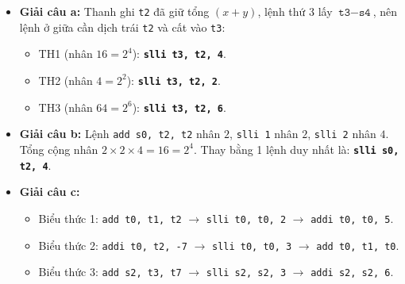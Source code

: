 \begin{itemize}
    \item \textbf{Giải câu a:} Thanh ghi \texttt{t2} đã giữ tổng $(x + y)$, lệnh thứ 3 lấy $\texttt{t3} - \texttt{s4}$, nên lệnh ở giữa cần dịch trái \texttt{t2} và cất vào \texttt{t3}:
    \begin{itemize}
        \item TH1 (nhân $16 = 2^4$): \textbf{\texttt{slli t3, t2, 4}}.
        \item TH2 (nhân $4 = 2^2$): \textbf{\texttt{slli t3, t2, 2}}.
        \item TH3 (nhân $64 = 2^6$): \textbf{\texttt{slli t3, t2, 6}}.
    \end{itemize}
    \item \textbf{Giải câu b:} Lệnh \texttt{add s0, t2, t2} nhân $2$, \texttt{slli 1} nhân $2$, \texttt{slli 2} nhân $4$. Tổng cộng nhân $2 \times 2 \times 4 = 16 = 2^4$. Thay bằng 1 lệnh duy nhất là: \textbf{\texttt{slli s0, t2, 4}}.
    \item \textbf{Giải câu c:}
    \begin{itemize}
        \item Biểu thức 1: \texttt{add t0, t1, t2} $\rightarrow$ \texttt{slli t0, t0, 2} $\rightarrow$ \texttt{addi t0, t0, 5}.
        \item Biểu thức 2: \texttt{addi t0, t2, -7} $\rightarrow$ \texttt{slli t0, t0, 3} $\rightarrow$ \texttt{add t0, t1, t0}.
        \item Biểu thức 3: \texttt{add s2, t3, t7} $\rightarrow$ \texttt{slli s2, s2, 3} $\rightarrow$ \texttt{addi s2, s2, 6}.
    \end{itemize}
\end{itemize}

